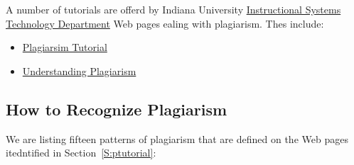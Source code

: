 A number of tutorials are offerd by Indiana University \href{http://education.indiana.edu/graduate/programs/instructional-systems/index.html}{Instructional
  Systems Technology Department}
 Web pages ealing with plagiarism. Thes include:

\begin{itemize}
\item
  \href{https://www.indiana.edu/~academy/firstPrinciples/choice.html}{Plagiarsim
    Tutorial}
\item
  \href{https://www.indiana.edu/~tedfrick/plagiarism/}{Understanding
  Plagiarism}
\end{itemize}

\subsection{How to Recognize Plagiarism}

We are listing fifteen patterns of plagiarism that are defined on the Web
pages itedntified in Section~\ref{S:ptutorial}:

